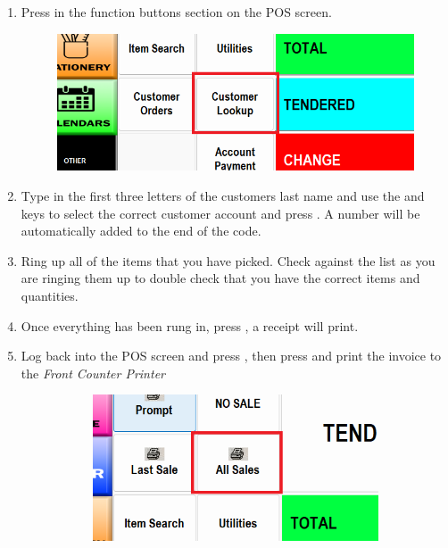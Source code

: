 \documentclass[a4paper, 12pt]{article}
\begin{document}
\begin{enumerate}
    \item Press  in the function buttons section on the POS screen.
    \begin{figure}[h]
        \centering
        \includegraphics[width=0.5\linewidth]{images/customerlookup.png}
    \end{figure}
    \item Type in the first three letters of the customers last name and use the \keys{\arrowkeyup} and \keys{\arrowkeydown} keys to select the correct customer account and press \keys{\enter}. A number will be automatically added to the end of the code.
    \item Ring up all of the items that you have picked. Check against the list as you are ringing them up to double check that you have the correct items and quantities.
    \item Once everything has been rung in, press , a receipt will print.
    \item Log back into the POS screen and press , then press  and print the invoice to the \textit{Front Counter Printer}
    \begin{figure}[h]
    \centering
        \hfill
        \begin{subfigure}{0.4\linewidth}
            \centering
            \includegraphics[width=\linewidth]{images/allsales.png}
        \end{subfigure}
        \hfill
        \begin{subfigure}[b]{0.4\linewidth}

\end{subfigure}
\end{figure}
\end{enumerate}
\end{document}
